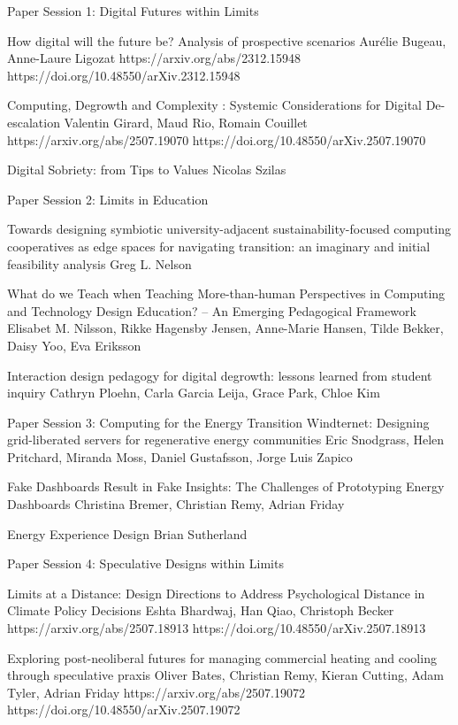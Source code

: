 
Paper Session 1: Digital Futures within Limits

	How digital will the future be? Analysis of prospective scenarios
Aurélie Bugeau, Anne-Laure Ligozat
        https://arxiv.org/abs/2312.15948
        https://doi.org/10.48550/arXiv.2312.15948

	Computing, Degrowth and Complexity : Systemic Considerations for Digital De-escalation
Valentin Girard, Maud Rio, Romain Couillet
        https://arxiv.org/abs/2507.19070
        https://doi.org/10.48550/arXiv.2507.19070

	Digital Sobriety: from Tips to Values
Nicolas Szilas


Paper Session 2: Limits in Education

	Towards designing symbiotic university-adjacent sustainability-focused computing cooperatives as edge spaces for navigating transition: an imaginary and initial feasibility analysis
Greg L. Nelson

	What do we Teach when Teaching More-than-human Perspectives in Computing and Technology Design Education? – An Emerging Pedagogical Framework
Elisabet M. Nilsson, Rikke Hagensby Jensen, Anne-Marie Hansen, Tilde Bekker, Daisy Yoo, Eva Eriksson

	Interaction design pedagogy for digital degrowth: lessons learned from student inquiry
Cathryn Ploehn, Carla Garcia Leija, Grace Park, Chloe Kim



Paper Session 3: Computing for the Energy Transition
	Windternet: Designing grid-liberated servers for regenerative energy communities
Eric Snodgrass, Helen Pritchard, Miranda Moss, Daniel Gustafsson, Jorge Luis Zapico

	Fake Dashboards Result in Fake Insights: The Challenges of Prototyping Energy Dashboards
Christina Bremer, Christian Remy, Adrian Friday

	Energy Experience Design
Brian Sutherland



Paper Session 4: Speculative Designs within Limits

	Limits at a Distance: Design Directions to Address Psychological Distance in Climate Policy Decisions
Eshta Bhardwaj, Han Qiao, Christoph Becker
        https://arxiv.org/abs/2507.18913
        https://doi.org/10.48550/arXiv.2507.18913

	Exploring post-neoliberal futures for managing commercial heating and cooling through speculative praxis
Oliver Bates, Christian Remy, Kieran Cutting, Adam Tyler, Adrian Friday
        https://arxiv.org/abs/2507.19072
        https://doi.org/10.48550/arXiv.2507.19072
        

